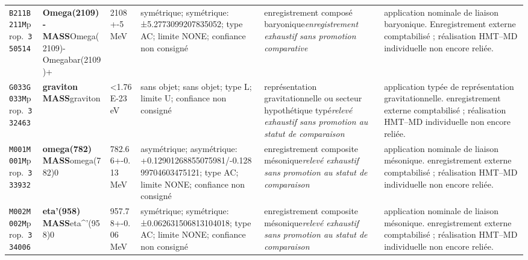 \begin{landscape}
\begin{longtable}{L{1.85cm}L{4.45cm}L{2.35cm}L{4.05cm}L{3.35cm}L{7.15cm}}
\texttt{B211}\newline \texttt{B211M}\newline prop.\ \texttt{350514} & \textbf{Omega(2109)- MASS}\newline Omega(2109)- \textbar{}\allowbreak{} Omegabar(2109)+ & 2108+-5\,MeV & symétrique; symétrique: ±5.2773099207835052; type AC; limite NONE; confiance non consigné & enregistrement composé baryonique\newline \emph{enregistrement exhaustif sans promotion comparative} & application nominale de liaison baryonique. Enregistrement externe comptabilisé ; réalisation HMT--MD individuelle non encore reliée. \\
\texttt{G033}\newline \texttt{G033M}\newline prop.\ \texttt{332463} & \textbf{graviton MASS}\newline graviton & \textless{}1.76E-23\,eV & sans objet; sans objet; type L; limite U; confiance non consigné & représentation gravitationnelle ou secteur hypothétique typé\newline \emph{relevé exhaustif sans promotion au statut de comparaison} & application typée de représentation gravitationnelle. enregistrement externe comptabilisé ; réalisation HMT--MD individuelle non encore reliée. \\
\texttt{M001}\newline \texttt{M001M}\newline prop.\ \texttt{333932} & \textbf{omega(782) MASS}\newline omega(782)0 & 782.66+-0.13\,MeV & asymétrique; asymétrique: +0.12901268855075981/-0.12899704603475121; type AC; limite NONE; confiance non consigné & enregistrement composite mésonique\newline \emph{relevé exhaustif sans promotion au statut de comparaison} & application nominale de liaison mésonique. enregistrement externe comptabilisé ; réalisation HMT--MD individuelle non encore reliée. \\
\texttt{M002}\newline \texttt{M002M}\newline prop.\ \texttt{334006} & \textbf{eta'(958) MASS}\newline eta\textasciicircum{}'(958)0 & 957.78+-0.06\,MeV & symétrique; symétrique: ±0.062631506813104018; type AC; limite NONE; confiance non consigné & enregistrement composite mésonique\newline \emph{relevé exhaustif sans promotion au statut de comparaison} & application nominale de liaison mésonique. enregistrement externe comptabilisé ; réalisation HMT--MD individuelle non encore reliée. \\

\end{longtable}
\end{landscape}
